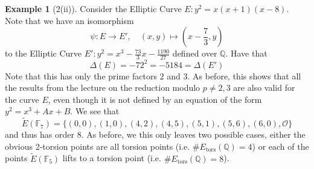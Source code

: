 \documentclass{scrartcl}
\newcommand{\F}{\mathbb{F}}
\newcommand{\Q}{\mathbb{Q}}
\renewcommand{\O}{\mathcal{O}}
\theoremstyle{definition}
\newtheorem{example}[prop]{Example}
\begin{document}
\begin{example}[2(ii)]
    \label{ex:2ii}
    Consider the Elliptic Curve $E: y^2 = x(x + 1)(x - 8)$.
    Note that we have an isomorphism
    \begin{equation*}
        \psi: E \to E', \quad (x, y) \mapsto \left( x - \frac 7 3, y \right)
    \end{equation*}
    to the Elliptic Curve $E': y^2 = x^3 - \frac {73} 3 x - \frac {1190} {27}$ defined over $\Q$.
    Have that
    \begin{equation*}
        \Delta(E) = -72^2 = -5184 = \Delta(E')
    \end{equation*}
    Note that this has only the prime factors $2$ and $3$.
    As before, this shows that all the results from the lecture on the reduction modulo $p \neq 2, 3$ are also valid for the curve $E$, even though it is not defined by an equation of the form $y^2 = x^3 + Ax + B$.
    We see that
    \begin{equation*}
        \tilde{E}(\F_7) = \{ (0, 0), (1, 0), (4, 2), (4, 5), (5, 1), (5, 6), (6, 0), \O \}
    \end{equation*}
    and thus has order 8.
    As before, we this only leaves two possible cases, either the obvious 2-torsion points are all torsion points (i.e. $\#E_{\mathrm{tors}}(\Q) = 4$) or each of the points $\tilde{E}(\F_5)$ lifts to a torsion point (i.e. $\#E_{\mathrm{tors}}(\Q) = 8$).


\end{example}
\end{document}
